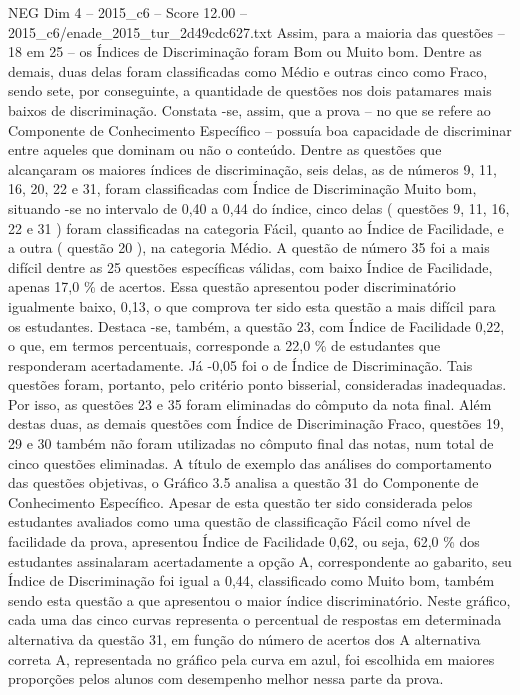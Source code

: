 \begin{textsample}{NEG Dim 4 – 2015\_c6 – Score 12.00 – 2015\_c6/enade\_2015\_tur\_2d49cdc627.txt}
Assim, para a maioria das questões – 18 em 25 – os Índices de Discriminação foram Bom ou Muito bom.
Dentre as demais, duas delas foram classificadas como Médio e outras cinco como Fraco, sendo sete, por conseguinte, a quantidade de questões nos dois patamares mais baixos de discriminação.
Constata -se, assim, que a prova – no que se refere ao Componente de Conhecimento Específico – possuía boa capacidade de discriminar entre aqueles que dominam ou não o conteúdo.
Dentre as questões que alcançaram os maiores índices de discriminação, seis delas, as de números 9, 11, 16, 20, 22 e 31, foram classificadas com Índice de Discriminação Muito bom, situando -se no intervalo de 0,40 a 0,44 do índice, cinco delas ( questões 9, 11, 16, 22 e 31 ) foram classificadas na categoria Fácil, quanto ao Índice de Facilidade, e a outra ( questão 20 ), na categoria Médio.
A questão de número 35 foi a mais difícil dentre as 25 questões específicas válidas, com baixo Índice de Facilidade, apenas 17,0 \% de acertos.
Essa questão apresentou poder discriminatório igualmente baixo, 0,13, o que comprova ter sido esta questão a mais difícil para os estudantes.
Destaca -se, também, a questão 23, com Índice de Facilidade 0,22, o que, em termos percentuais, corresponde a 22,0 \% de estudantes que responderam acertadamente.
Já -0,05 foi o de Índice de Discriminação.
Tais questões foram, portanto, pelo critério ponto bisserial, consideradas inadequadas.
Por isso, as questões 23 e 35 foram eliminadas do cômputo da nota final.
Além destas duas, as demais questões com Índice de Discriminação Fraco, questões 19, 29 e 30 também não foram utilizadas no cômputo final das notas, num total de cinco questões eliminadas.
A título de exemplo das análises do comportamento das questões objetivas, o Gráfico 3.5 analisa a questão 31 do Componente de Conhecimento Específico.
Apesar de esta questão ter sido considerada pelos estudantes avaliados como uma questão de classificação Fácil como nível de facilidade da prova, apresentou Índice de Facilidade 0,62, ou seja, 62,0 \% dos estudantes assinalaram acertadamente a opção A, correspondente ao gabarito, seu Índice de Discriminação foi igual a 0,44, classificado como Muito bom, também sendo esta questão a que apresentou o maior índice discriminatório.
Neste gráfico, cada uma das cinco curvas representa o percentual de respostas em determinada alternativa da questão 31, em função do número de acertos dos A alternativa correta A, representada no gráfico pela curva em azul, foi escolhida em maiores proporções pelos alunos com desempenho melhor nessa parte da prova.

\end{textsample}

